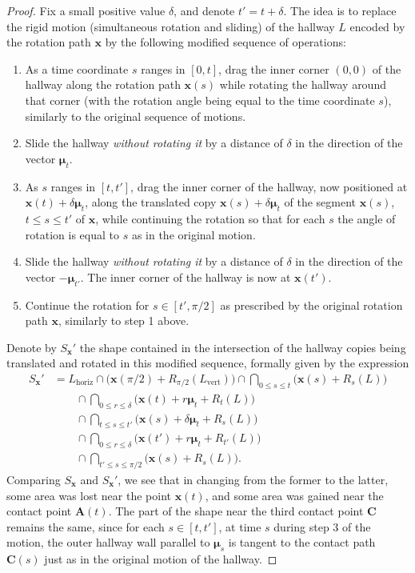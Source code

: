 \documentclass[11pt]{article}
\newcommand{\armh}{L_{\textrm{horiz}}}
\newcommand{\armv}{L_{\textrm{vert}}}
\newcommand{\hallway}{L}
\newcommand{\rotmat}[1]{R_{#1}}
\newcommand{\nvecone}{\boldsymbol{\mu}}
\begin{document}
\begin{proof}
Fix a small positive value $\delta$, and denote $t'=t+\delta$. The idea is to replace the rigid motion (simultaneous rotation and sliding) of the hallway $L$ encoded by the rotation path $\mathbf{x}$ by the following modified sequence of operations:
\begin{enumerate}
\item As a time coordinate $s$ ranges in $[0,t]$, drag the inner corner $(0,0)$ of the hallway along the rotation path $\mathbf{x}(s)$ while rotating the hallway around that corner (with the rotation angle being equal to the time coordinate $s$), similarly to the original sequence of motions.
\item Slide the hallway \emph{without rotating it} by a distance of $\delta$ in the direction of the vector $\nvecone_t$.
\item As $s$ ranges in $[t,t']$, drag the inner corner of the hallway, now positioned at $\mathbf{x}(t)+\delta \nvecone_t$, along the translated copy $\mathbf{x}(s) + \delta \nvecone_t$ of the segment $\mathbf{x}(s)$, $t\le s\le t'$ of $\mathbf{x}$, while continuing the rotation so that for each $s$ the angle of rotation is equal to $s$ as in the original motion.
\item Slide the hallway \emph{without rotating it} by a distance of $\delta$ in the direction of the vector $-\nvecone_{t'}$. The inner corner of the hallway is now at $\mathbf{x}(t')$.
\item Continue the rotation for $s\in [t',\pi/2]$ as prescribed by the original rotation path $\mathbf{x}$, similarly to step 1 above.
\end{enumerate}
Denote by $S_\mathbf{x}'$ the shape contained in the intersection of the hallway copies being translated and rotated in this modified sequence, formally given by the expression
\begin{align*}
S_\mathbf{x}' &=
\armh \cap \Big(\mathbf{x}(\pi/2)+\rotmat{\pi/2}(\armv) \Big)
\cap \bigcap_{0\le s\le t} \Big(\mathbf{x}(s)+\rotmat{s}(\hallway)\Big)
\\ & \qquad \cap \bigcap_{0\le r \le \delta} \Big(\mathbf{x}(t)+ r \nvecone_t+\rotmat{t}(\hallway)\Big)
\\ & \qquad \cap \bigcap_{t\le s\le t'} \Big(\mathbf{x}(s)+\delta \nvecone_t +\rotmat{s}(\hallway)\Big)
\\ & \qquad \cap \bigcap_{0\le r \le \delta} \Big(\mathbf{x}(t')+ r \nvecone_t+\rotmat{t'}(\hallway)\Big)
\\ & \qquad \cap \bigcap_{t'\le s\le \pi/2} \Big(\mathbf{x}(s)+\rotmat{s}(\hallway)\Big).
\end{align*}
Comparing $S_\mathbf{x}$ and $S_\mathbf{x}'$, we see that in changing from the former to the latter, some area was lost near the point $\mathbf{x}(t)$, and some area was gained near the contact point $\mathbf{A}(t)$. The part of the shape near the third contact point $\mathbf{C}$ remains the same, since for each $s\in [t,t']$, at time $s$ during step 3 of the motion, the outer hallway wall parallel to $\nvecone_s$ is tangent to the contact path $\mathbf{C}(s)$ just as in the original motion of the hallway.


\end{proof}
\end{document}
